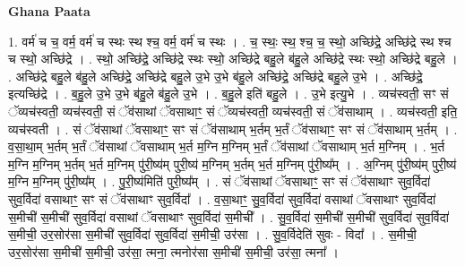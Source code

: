 \documentclass[17pt]{extarticle}
\begin{document}
\textbf{Ghana Paata } \newline

1. वर्म॑ च च॒ वर्म॒ वर्म॑ च स्थः स्थ श्च॒ वर्म॒ वर्म॑ च स्थः । . च॒ स्थः॒ स्थ॒ श्च॒ च॒ स्थो॒ अच्छि॑द्रे॒ अच्छि॑द्रे स्थ श्च च स्थो॒ अच्छि॑द्रे । . स्थो॒ अच्छि॑द्रे॒ अच्छि॑द्रे स्थः स्थो॒ अच्छि॑द्रे बहु॒ले ब॑हु॒ले अच्छि॑द्रे स्थः स्थो॒ अच्छि॑द्रे बहु॒ले । . अच्छि॑द्रे बहु॒ले ब॑हु॒ले अच्छि॑द्रे॒ अच्छि॑द्रे बहु॒ले उ॒भे उ॒भे ब॑हु॒ले अच्छि॑द्रे॒ अच्छि॑द्रे बहु॒ले उ॒भे । . अच्छि॑द्रे॒ इत्यच्छि॑द्रे । . ब॒हु॒ले उ॒भे उ॒भे ब॑हु॒ले ब॑हु॒ले उ॒भे । . ब॒हु॒ले इति॑ बहु॒ले । . उ॒भे इत्यु॒भे । . व्यच॑स्वती॒ सꣳ सं ॅव्यच॑स्वती॒ व्यच॑स्वती॒ सं ॅव॑साथां ॅवसाथाꣳ॒॒ सं ॅव्यच॑स्वती॒ व्यच॑स्वती॒ सं ॅव॑साथाम् । . व्यच॑स्वती॒ इति॒ व्यच॑स्वती । . सं ॅव॑साथां ॅवसाथाꣳ॒॒ सꣳ सं ॅव॑साथाम् भ॒र्तम् भ॒र्तं ॅव॑साथाꣳ॒॒ सꣳ सं ॅव॑साथाम् भ॒र्तम् । . व॒सा॒था॒म् भ॒र्तम् भ॒र्तं ॅव॑साथां ॅवसाथाम् भ॒र्त म॒ग्नि म॒ग्निम् भ॒र्तं ॅव॑साथां ॅवसाथाम् भ॒र्त म॒ग्निम् । . भ॒र्त म॒ग्नि म॒ग्निम् भ॒र्तम् भ॒र्त म॒ग्निम् पु॑री॒ष्य॑म् पुरी॒ष्य॑ म॒ग्निम् भ॒र्तम् भ॒र्त म॒ग्निम् पु॑री॒ष्य᳚म् । . अ॒ग्निम् पु॑री॒ष्य॑म् पुरी॒ष्य॑ म॒ग्नि म॒ग्निम् पु॑री॒ष्य᳚म् । . पु॒री॒ष्य॑मिति॑ पुरी॒ष्य᳚म् । . सं ॅव॑साथां ॅवसाथाꣳ॒॒ सꣳ सं ॅव॑साथाꣳ सुव॒र्विदा॑ सुव॒र्विदा॑ वसाथाꣳ॒॒ सꣳ सं ॅव॑साथाꣳ सुव॒र्विदा᳚ । . व॒सा॒थाꣳ॒॒ सु॒व॒र्विदा॑ सुव॒र्विदा॑ वसाथां ॅवसाथाꣳ सुव॒र्विदा॑ स॒मीची॑ स॒मीची॑ सुव॒र्विदा॑ वसाथां ॅवसाथाꣳ सुव॒र्विदा॑ स॒मीची᳚ । . सु॒व॒र्विदा॑ स॒मीची॑ स॒मीची॑ सुव॒र्विदा॑ सुव॒र्विदा॑ स॒मीची॒ उर॒सोर॑सा स॒मीची॑ सुव॒र्विदा॑ सुव॒र्विदा॑ स॒मीची॒ उर॑सा । . सु॒व॒र्विदेति॑ सुवः - विदा᳚ । . स॒मीची॒ उर॒सोर॑सा स॒मीची॑ स॒मीची॒ उर॑सा॒ त्मना॒ त्मनोर॑सा स॒मीची॑ स॒मीची॒ उर॑सा॒ त्मना᳚ । \newline
\end{document}
